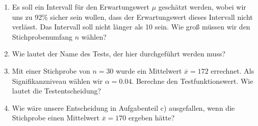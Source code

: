 \documentclass[11pt, a4paper]{article}
\begin{document}
\begin{enumerate}[label=\alph*)]
\item Es soll ein Intervall für den Erwartungswert $\mu$ geschätzt werden, wobei wir uns zu 92\% sicher sein wollen, dass der Erwartungswert dieses Intervall nicht verlässt. Das Intervall soll nicht länger als 10 sein. Wie groß müssen wir den Stichprobenumfang $n$ wählen?
\item Wie lautet der Name des Tests, der hier durchgeführt werden muss?
\item Mit einer Stichprobe von $n = 30$ wurde ein Mittelwert $\overline{x} = 172$ errechnet. Als Signifikanzniveau wählen wir $\alpha = 0.04$. Berechne den Testfunktionswert. Wie lautet die Testentscheidung?
\item Wie wäre unsere Entscheidung in Aufgabenteil c) ausgefallen, wenn die Stichprobe einen Mittelwert $\overline{x} = 170$ ergeben hätte?
\end{enumerate}
\end{document}
